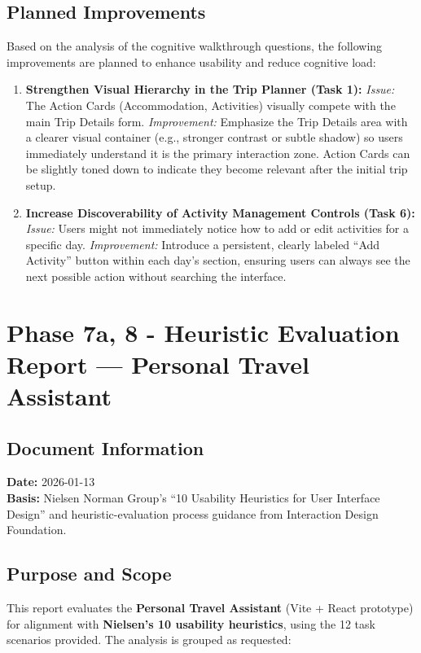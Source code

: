 \documentclass[11pt,a4paper]{article}
\begin{document}
\subsection*{Planned Improvements}
Based on the analysis of the cognitive walkthrough questions, the following improvements are planned to enhance usability and reduce cognitive load:

\begin{enumerate}
    \item \textbf{Strengthen Visual Hierarchy in the Trip Planner (Task 1):}
    \textit{Issue:} The Action Cards (Accommodation, Activities) visually compete with the main Trip Details form.
    \textit{Improvement:} Emphasize the Trip Details area with a clearer visual container (e.g., stronger contrast or subtle shadow) so users immediately understand it is the primary interaction zone. Action Cards can be slightly toned down to indicate they become relevant after the initial trip setup.

    \item \textbf{Increase Discoverability of Activity Management Controls (Task 6):}  
    \textit{Issue:} Users might not immediately notice how to add or edit activities for a specific day.  
    \textit{Improvement:} Introduce a persistent, clearly labeled “Add Activity” button within each day’s section, ensuring users can always see the next possible action without searching the interface.

\end{enumerate}

\section*{Phase 7a, 8 - Heuristic Evaluation Report — Personal Travel Assistant}

\subsection*{Document Information}
\textbf{Date:} 2026-01-13\\
\textbf{Basis:} Nielsen Norman Group's ``10 Usability Heuristics for User Interface Design'' and heuristic-evaluation process guidance from Interaction Design Foundation.

\subsection{Purpose and Scope}
This report evaluates the \textbf{Personal Travel Assistant} (Vite + React prototype) for alignment with \textbf{Nielsen's 10 usability heuristics}, using the 12 task scenarios provided. The analysis is grouped as requested:
\end{document}
